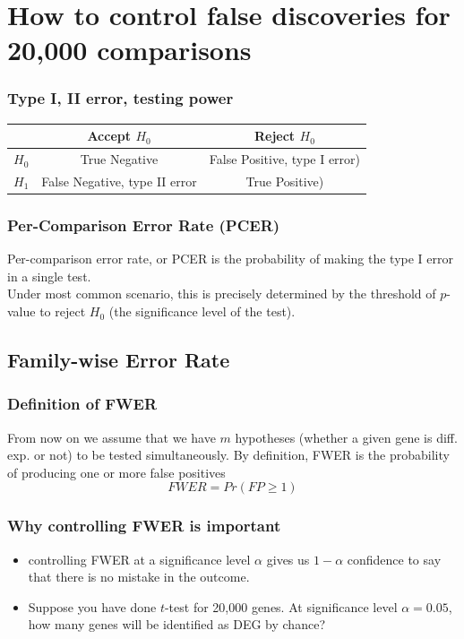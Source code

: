 \section{How to control false discoveries for 20,000 comparisons}

\begin{frame}
  \frametitle{Type I, II error, testing power}
  \begin{tabular}{|l|c|c|}
    & Accept $H_0$ & Reject $H_0$ \\
    \hline
    $H_0$  & True Negative & False Positive, type I error) \\
    \hline
    $H_1$  & False Negative, type II error & True Positive) \\
  \end{tabular}
\end{frame}
\begin{frame}
  \frametitle{Per-Comparison Error Rate (PCER)} Per-comparison error
  rate, or PCER is the probability of making the type I error in a
  single test. \\
  Under most common scenario, this is precisely determined by the
  threshold of $p$-value to reject $H_0$ (the significance level of the
  test).
\end{frame}

\subsection{Family-wise Error Rate}
\begin{frame}
  \frametitle{Definition of FWER} From now on we assume that we have
  $m$ hypotheses (whether a given gene is diff. exp. or not) to be
  tested simultaneously. By definition, FWER is the probability of
  producing one or more false positives
  \begin{equation}
    \label{eq:fwer}
    FWER = Pr(FP \geq 1)
  \end{equation}
\end{frame}
\begin{frame}
  \frametitle{Why controlling FWER is important} 
  \begin{itemize}
  \item controlling FWER at a significance level $\alpha$ gives us
    $1-\alpha$ confidence to say
    that there is no mistake in the outcome.
  \item Suppose you have done $t$-test for 20,000 genes. At
    significance level $\alpha = 0.05$, how many genes will be
    identified as DEG \alert{by chance}?
  \end{itemize}
\end{frame}

